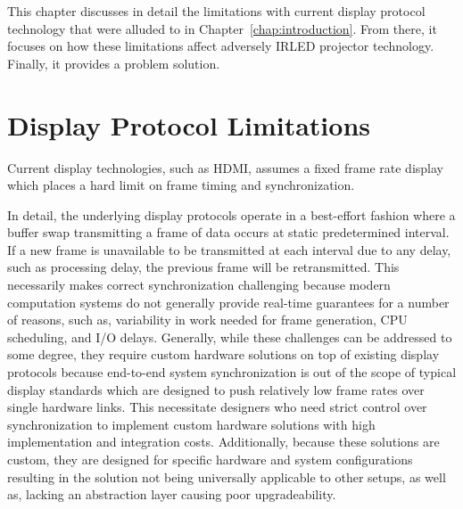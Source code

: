 \label{chap:problem_formulation}

This chapter discusses in detail the limitations with current display protocol technology that were alluded to in Chapter~\ref{chap:introduction}. From there, it focuses on how these limitations affect adversely IRLED projector technology. Finally, it provides a problem solution.

\section{Display Protocol Limitations}


Current display technologies, such as HDMI, assumes a fixed frame rate display which places a hard limit on frame timing and synchronization.

In detail, the underlying display protocols operate in a best-effort fashion where a buffer swap transmitting a frame of data occurs at static predetermined interval. If a new frame is unavailable to be transmitted at each interval due to any delay, such as processing delay, the previous frame will be retransmitted. This necessarily makes correct synchronization challenging because modern computation systems do not generally provide real-time guarantees for a number of reasons, such as, variability in work needed for frame generation, CPU scheduling, and I/O delays. Generally, while these challenges can be addressed to some degree, they require custom hardware solutions on top of existing display protocols because end-to-end system synchronization is out of the scope of typical display standards which are designed to push relatively low frame rates over single hardware links. This necessitate designers who need strict control over synchronization to implement custom hardware solutions with high implementation and integration costs. Additionally, because these solutions are custom, they are designed for specific hardware and system configurations resulting in the solution not being universally applicable to other setups, as well as, lacking an abstraction layer causing poor upgradeability.

